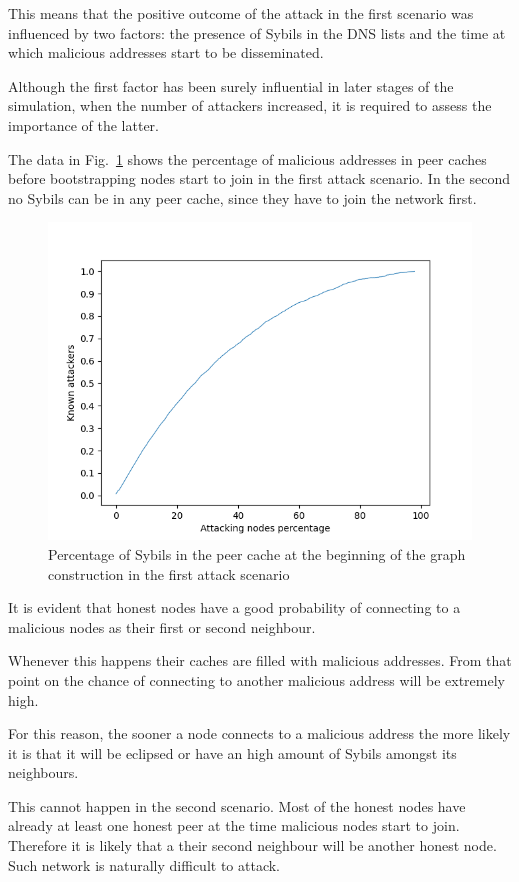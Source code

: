 This means that the positive outcome of the attack in the first scenario was influenced by two factors: the presence of Sybils in the DNS lists and the time at which malicious addresses start to be disseminated.

Although the first factor has been surely influential in later stages of the simulation, when the number of attackers increased, it is required to assess the importance of the latter.

The data in Fig.~\ref{fig:beginning} shows the percentage of malicious addresses in peer caches before bootstrapping nodes start to join in the first attack scenario. In the second no Sybils can be in any peer cache, since they have to join the network first.\\

\begin{figure}[h!]
	\includegraphics[width=.7\textwidth]{pict/results/in-atkknown-beginning.png}
	\centering
	\caption{Percentage of Sybils in the peer cache at the beginning of the graph construction in the first attack scenario}
	\label{fig:beginning}
\end{figure}

It is evident that honest nodes have a good probability of connecting to a malicious nodes as their first or second neighbour.

Whenever this happens their caches are filled with malicious addresses. From that point on the chance of connecting to another malicious address will be extremely high.

For this reason, the sooner a node connects to a malicious address the more likely it is that it will be eclipsed or have an high amount of Sybils amongst its neighbours.

This cannot happen in the second scenario. Most of the honest nodes have already at least one honest peer at the time malicious nodes start to join. Therefore it is likely that a their second neighbour will be another honest node. Such network is naturally difficult to attack.


